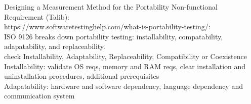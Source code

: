 \documentclass{article}
\begin{document}
\noindent Designing a Measurement Method for the Portability Non-functional Requirement (Talib):\\
 
\noindent https://www.softwaretestinghelp.com/what-is-portability-testing/:\\

ISO 9126 breaks down portability testing: installability, compatability, adapatability, and replaceability.\\ 

check Installability, Adaptability, Replaceability, Compatibility or Coexistence\\

Installability: validate OS reqs, memory and RAM reqs, clear installation and uninstallation procedures, additional prerequisites\\

Adapatability: hardware and software dependency, language dependency and communication system\\
\end{document}

